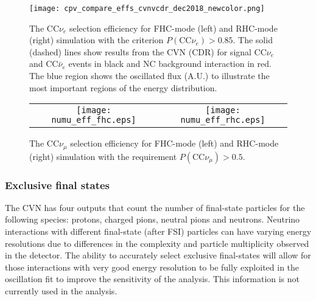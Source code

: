 \begin{figure}
    \centering
		\texttt{[image: cpv\_compare\_effs\_cvnvcdr\_dec2018\_newcolor.png]} %
	\caption{The CC$\nu_e$ selection efficiency for FHC-mode (left) and RHC-mode (right) simulation with the criterion $P(\textrm{CC}\nu_e) > 0.85$. The solid (dashed) lines show results from the CVN (CDR) for signal CC$\nu_e$ and CC$\bar{\nu}_e$ events in black and NC background interaction in red. The blue region shows the oscillated flux (A.U.) to illustrate the most important regions of the energy distribution.}
    \label{fig:nueeff}
\end{figure}

\begin{figure}
    \centering
    \begin{tabular}{cc}
		\texttt{[image: numu\_eff\_fhc.eps]} &
		\texttt{[image: numu\_eff\_rhc.eps]} 
	\end{tabular}
	\caption{The CC$\nu_\mu$ selection efficiency for FHC-mode (left) and RHC-mode (right) simulation with the requirement $P(\textrm{CC}\nu_\mu) > 0.5$.}
    \label{fig:numueff}
\end{figure}

\subsubsection{Exclusive final states}
The CVN has four outputs that count the number of final-state particles for the following species: protons, charged pions, neutral pions and neutrons. Neutrino interactions with different final-state (after FSI) particles can have varying energy resolutions due to differences in the complexity and particle multiplicity observed in the detector. The ability to accurately select exclusive final-states will allow for those interactions with very good energy resolution to be fully exploited in the oscillation fit to improve the sensitivity of the analysis. This information is not currently used in the analysis.

